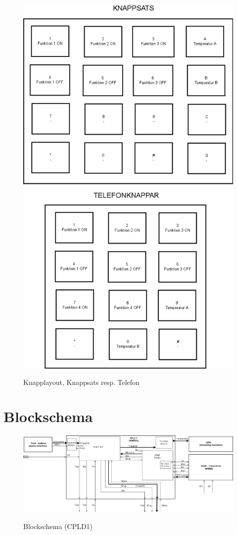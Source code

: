\documentclass[a4paper,11pt]{article}
\begin{document}
		\begin{figure}[ht!tb]
		  \centering
		      \includegraphics[scale=0.48, angle=0]{UserInterface.png}
			\label{fig:UserInterface}
		  	\caption{Knapplayout, Knappsats resp. Telefon}
		\end{figure}

	\section{Blockschema}
		\begin{figure}[ht!tb]
		  \centering
		      \includegraphics[scale=0.48, angle=90]{BlockDiagramCPLD1.png}
			\label{fig:BlockDiagram1}
		  	\caption{Blockschema (CPLD1)}
		\end{figure}
\end{document}
